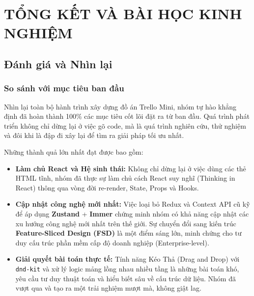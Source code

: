 \part{TỔNG KẾT VÀ BÀI HỌC KINH NGHIỆM}

\chapter{Đánh giá và Nhìn lại}
\section{So sánh với mục tiêu ban đầu}
Nhìn lại toàn bộ hành trình xây dựng đồ án Trello Mini, nhóm tự hào khẳng định đã hoàn thành 100\% các mục tiêu cốt lõi đặt ra từ ban đầu. Quá trình phát triển không chỉ dừng lại ở việc gõ code, mà là quá trình nghiên cứu, thử nghiệm và đôi khi là đập đi xây lại để tìm ra giải pháp tối ưu nhất.

Những thành quả lớn nhất đạt được bao gồm:
\begin{itemize}
    \item \textbf{Làm chủ React và Hệ sinh thái:} Không chỉ dừng lại ở việc dùng các thẻ HTML tĩnh, nhóm đã thực sự làm chủ cách React suy nghĩ (Thinking in React) thông qua vòng đời re-render, State, Props và Hooks.
    \item \textbf{Cập nhật công nghệ mới nhất:} Việc loại bỏ Redux và Context API cũ kỹ để áp dụng \textbf{Zustand} + \textbf{Immer} chứng minh nhóm có khả năng cập nhật các xu hướng công nghệ mới nhất trên thế giới. Sự chuyển đổi sang kiến trúc \textbf{Feature-Sliced Design (FSD)} là một điểm sáng lớn, minh chứng cho tư duy cấu trúc phần mềm cấp độ doanh nghiệp (Enterprise-level).
    \item \textbf{Giải quyết bài toán thực tế:} Tính năng Kéo Thả (Drag and Drop) với \texttt{dnd-kit} và xử lý logic mảng lồng nhau nhiều tầng là những bài toán khó, yêu cầu tư duy thuật toán và hiểu biết sâu về cấu trúc dữ liệu. Nhóm đã vượt qua và tạo ra một trải nghiệm mượt mà, không giật lag.
\end{itemize}

